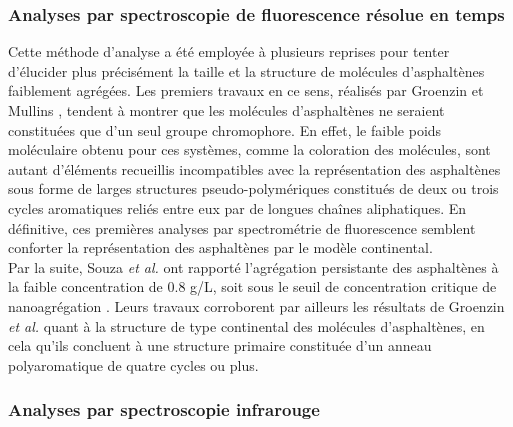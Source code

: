 \subsubsection{Analyses par spectroscopie de fluorescence résolue en temps} 

Cette méthode d'analyse a été employée à plusieurs reprises pour tenter d'élucider plus précisément la taille et la structure de molécules d'asphaltènes faiblement agrégées.  
Les premiers travaux en ce sens, réalisés par Groenzin et Mullins  \cite{groenzin1999asphaltene}, tendent à montrer que les molécules d'asphaltènes ne seraient constituées que d'un seul groupe chromophore. En effet, le faible poids moléculaire obtenu pour ces systèmes, comme la coloration des molécules, sont autant d'éléments recueillis incompatibles avec la représentation des asphaltènes sous forme de larges structures pseudo-polymériques constitués de deux ou trois cycles aromatiques reliés entre eux par de longues chaînes aliphatiques. En définitive, ces premières analyses par spectrométrie de fluorescence semblent conforter la représentation des asphaltènes par le modèle continental. \\
Par la suite, Souza \textit{et al.} ont rapporté l'agrégation persistante des asphaltènes à la faible concentration de 0.8 g/L, soit sous le seuil de concentration critique de nanoagrégation \cite{souza2009study}. Leurs travaux corroborent par ailleurs les résultats de Groenzin \textit{et al.}\cite{groenzin1999asphaltene} quant à la structure de type \og continental \fg{} des molécules d'asphaltènes, en cela qu'ils concluent à une structure primaire constituée d'un anneau polyaromatique de quatre cycles ou plus. 




\subsubsection{Analyses par spectroscopie infrarouge}

